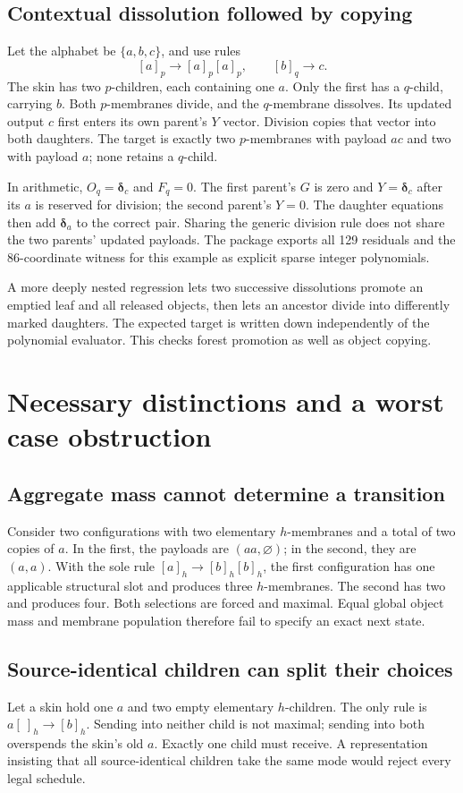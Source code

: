 \documentclass[11pt,letterpaper]{article}
\theoremstyle{definition}
\theoremstyle{remark}
\newcommand{\ee}{\boldsymbol\delta}
\begin{document}
\subsection{Contextual dissolution followed by copying}\label{qoc:mm:sec:contextcopy}
Let the alphabet be $\{a,b,c\}$, and use rules
\[
 [a]_p\to[a]_p[a]_p,\qquad [b]_q\to c.
\]
The skin has two $p$-children, each containing one $a$. Only the first has a $q$-child, carrying $b$. Both $p$-membranes divide, and the $q$-membrane dissolves. Its updated output $c$ first enters its own parent's $Y$ vector. Division copies that vector into both daughters. The target is exactly two $p$-membranes with payload $ac$ and two with payload $a$; none retains a $q$-child.

In arithmetic, $O_q=\ee_c$ and $F_q=0$. The first parent's $G$ is zero and $Y=\ee_c$ after its $a$ is reserved for division; the second parent's $Y=0$. The daughter equations then add $\ee_a$ to the correct pair. Sharing the generic division rule does not share the two parents' updated payloads. The package exports all 129 residuals and the 86-coordinate witness for this example as explicit sparse integer polynomials.

A more deeply nested regression lets two successive dissolutions promote an emptied leaf and all released objects, then lets an ancestor divide into differently marked daughters. The expected target is written down independently of the polynomial evaluator. This checks forest promotion as well as object copying.

\section{Necessary distinctions and a worst case obstruction}\label{qoc:mm:sec:limits}
\subsection{Aggregate mass cannot determine a transition}
Consider two configurations with two elementary $h$-membranes and a total of two copies of $a$. In the first, the payloads are $(aa,\varnothing)$; in the second, they are $(a,a)$. With the sole rule $[a]_h\to[b]_h[b]_h$, the first configuration has one applicable structural slot and produces three $h$-membranes. The second has two and produces four. Both selections are forced and maximal. Equal global object mass and membrane population therefore fail to specify an exact next state.

\subsection{Source-identical children can split their choices}
Let a skin hold one $a$ and two empty elementary $h$-children. The only rule is $a[\ ]_h\to[b]_h$. Sending into neither child is not maximal; sending into both overspends the skin's old $a$. Exactly one child must receive. A representation insisting that all source-identical children take the same mode would reject every legal schedule.
\end{document}
